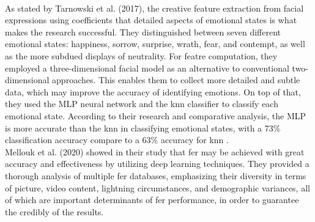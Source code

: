 \begin{figure}[H]
    \centering
    \qquad
    \vspace{0.5cm}
    \\
    \scriptsize{\citep{tarnowski_2017_emotion}}
\end{figure}
\indent As stated by Tarnowski et al. (2017), the creative feature extraction from facial expressions using coefficients that detailed aspects of emotional states is what makes the research successful.
They distinguished between seven different emotional states: happiness, sorrow, surprise, wrath, fear, and contempt, as well as the more subdued displays of neutrality. 
For featre computation, they employed a three-dimensional facial model as an alternative to conventional two-dimensional approaches. 
This enables them to collect more detailed and subtle data, which may improve the accuracy of identifying emotions. 
On top of that, they used the MLP neural network and the \gls{knn} classifier to classify each emotional state. 
According to their research and comparative analysis, the MLP is more accurate than the \gls{knn} in classifying emotional states, with a 73\% classification accuracy compare to a 63\% accuracy for \gls{knn} \citep{tarnowski_2017_emotion}.
\\
\indent Mellouk et al. (2020) showed in their study that \gls{fer} may be achieved with great accuracy and effectiveness by utilizing deep learning techniques.
They provided a thorough analysis of multiple \gls{fer} databases, emphasizing their diversity in terms of picture, video content, lightning circumstances, and demographic variances, all of which are important determinants of \gls{fer} performance, in order to guarantee the credibly of the results.
